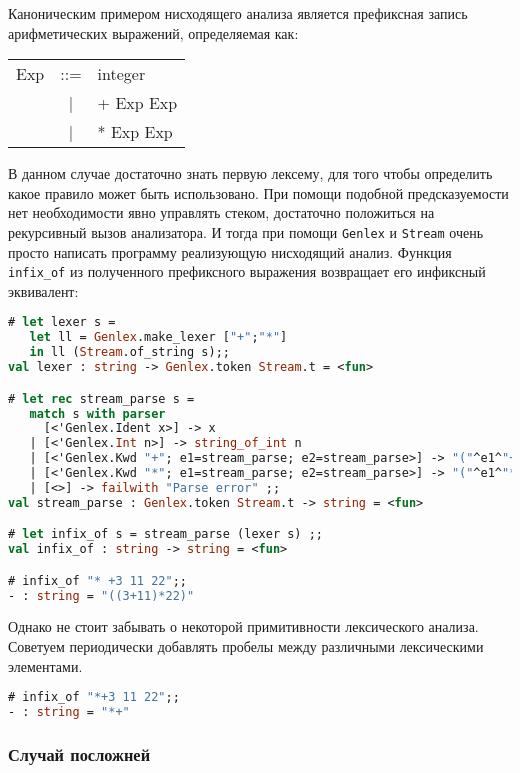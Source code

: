 Каноническим примером нисходящего анализа является префиксная запись
арифметических выражений, определяемая как:

\begin{center}
	\begin{tabular}{rcl}
		Exp & ::= & integer \\
		& | & + Exp Exp \\
		& | & * Exp Exp \\
	\end{tabular}
\end{center}

В данном случае достаточно знать первую лексему, для того чтобы определить какое
правило может быть использовано. При помощи подобной предсказуемости нет
необходимости явно управлять стеком, достаточно положиться на рекурсивный вызов
анализатора. И тогда при помощи \texttt{Genlex} и \texttt{Stream} очень просто
написать программу реализующую нисходящий анализ. Функция \texttt{infix\_of} из
полученного префиксного выражения возвращает его инфиксный эквивалент:

\begin{lstlisting}[language=Caml]
# let lexer s =
   let ll = Genlex.make_lexer ["+";"*"]
   in ll (Stream.of_string s);;
val lexer : string -> Genlex.token Stream.t = <fun>

# let rec stream_parse s =
   match s with parser
     [<'Genlex.Ident x>] -> x
   | [<'Genlex.Int n>] -> string_of_int n
   | [<'Genlex.Kwd "+"; e1=stream_parse; e2=stream_parse>] -> "("^e1^"+"^e2^")"
   | [<'Genlex.Kwd "*"; e1=stream_parse; e2=stream_parse>] -> "("^e1^"*"^e2^")"
   | [<>] -> failwith "Parse error" ;;
val stream_parse : Genlex.token Stream.t -> string = <fun>

# let infix_of s = stream_parse (lexer s) ;;
val infix_of : string -> string = <fun>

# infix_of "* +3 11 22";;
- : string = "((3+11)*22)"
\end{lstlisting}

Однако не стоит забывать о некоторой примитивности лексического анализа.
Советуем периодически добавлять пробелы между различными лексическими
элементами.

\begin{lstlisting}[language=Caml]
# infix_of "*+3 11 22";;
- : string = "*+"
\end{lstlisting}

\subsubsection{Случай посложней}


